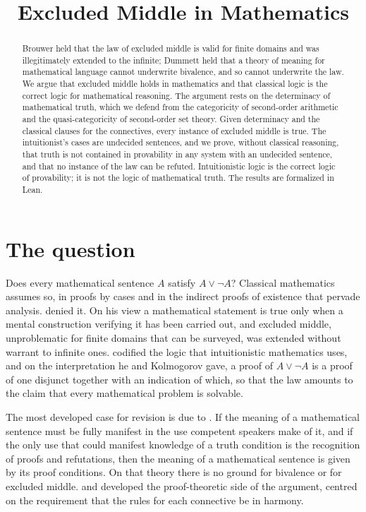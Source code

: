 \documentclass{situationist-preprint}
\title{Excluded Middle in Mathematics}
\begin{document}
\maketitle

\begin{abstract}
Brouwer held that the law of excluded middle is valid for finite domains and was illegitimately extended to the infinite; Dummett held that a theory of meaning for mathematical language cannot underwrite bivalence, and so cannot underwrite the law. We argue that excluded middle holds in mathematics and that classical logic is the correct logic for mathematical reasoning. The argument rests on the determinacy of mathematical truth, which we defend from the categoricity of second-order arithmetic and the quasi-categoricity of second-order set theory. Given determinacy and the classical clauses for the connectives, every instance of excluded middle is true. The intuitionist's cases are undecided sentences, and we prove, without classical reasoning, that truth is not contained in provability in any system with an undecided sentence, and that no instance of the law can be refuted. Intuitionistic logic is the correct logic of provability; it is not the logic of mathematical truth. The results are formalized in Lean.
\end{abstract}

\section{The question}

Does every mathematical sentence $A$ satisfy $A \vee \neg A$? Classical mathematics assumes so, in proofs by cases and in the indirect proofs of existence that pervade analysis. \citet{Brouwer1908} denied it. On his view a mathematical statement is true only when a mental construction verifying it has been carried out, and excluded middle, unproblematic for finite domains that can be surveyed, was extended without warrant to infinite ones. \citet{Heyting1930} codified the logic that intuitionistic mathematics uses, and on the interpretation he and Kolmogorov gave, a proof of $A \vee \neg A$ is a proof of one disjunct together with an indication of which, so that the law amounts to the claim that every mathematical problem is solvable.

The most developed case for revision is due to \citet{Dummett1975,Dummett1977}. If the meaning of a mathematical sentence must be fully manifest in the use competent speakers make of it, and if the only use that could manifest knowledge of a truth condition is the recognition of proofs and refutations, then the meaning of a mathematical sentence is given by its proof conditions. On that theory there is no ground for bivalence or for excluded middle. \citet{Prawitz1977} and \citet{Tennant1997} developed the proof-theoretic side of the argument, centred on the requirement that the rules for each connective be in harmony.
\end{document}
